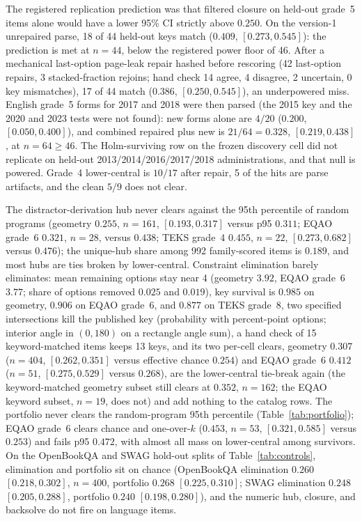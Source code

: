 The registered replication prediction was that filtered closure on held-out grade~5 items alone would have a lower 95\% CI strictly above $0.250$. On the version-1 unrepaired parse, 18 of 44 held-out keys match ($0.409$, $[0.273, 0.545]$): the prediction is met at $n=44$, below the registered power floor of 46. After a mechanical last-option page-leak repair hashed before rescoring (42 last-option repairs, 3 stacked-fraction rejoins; hand check 14 agree, 4 disagree, 2 uncertain, 0 key mismatches), 17 of 44 match ($0.386$, $[0.250, 0.545]$), an underpowered miss. English grade~5 forms for 2017 and 2018 were then parsed (the 2015 key and the 2020 and 2023 tests were not found): new forms alone are $4/20$ ($0.200$, $[0.050, 0.400]$), and combined repaired plus new is $21/64=0.328$, $[0.219, 0.438]$, at $n=64\ge 46$. The Holm-surviving row on the frozen discovery cell did not replicate on held-out 2013/2014/2016/2017/2018 administrations, and that null is powered. Grade~4 lower-central is $10/17$ after repair, 5 of the hits are parse artifacts, and the clean $5/9$ does not clear.

The distractor-derivation hub never clears against the 95th percentile of random programs (geometry $0.255$, $n=161$, $[0.193, 0.317]$ versus p95 $0.311$; EQAO grade~6 $0.321$, $n=28$, versus $0.438$; TEKS grade~4 $0.455$, $n=22$, $[0.273, 0.682]$ versus $0.476$); the unique-hub share among 992 family-scored items is $0.189$, and most hubs are ties broken by lower-central. Constraint elimination barely eliminates: mean remaining options stay near 4 (geometry $3.92$, EQAO grade~6 $3.77$; share of options removed $0.025$ and $0.019$), key survival is $0.985$ on geometry, $0.906$ on EQAO grade~6, and $0.877$ on TEKS grade~8, two specified intersections kill the published key (probability with percent-point options; interior angle in $(0,180)$ on a rectangle angle sum), a hand check of 15 keyword-matched items keeps 13 keys, and its two per-cell clears, geometry $0.307$ ($n=404$, $[0.262, 0.351]$ versus effective chance $0.254$) and EQAO grade~6 $0.412$ ($n=51$, $[0.275, 0.529]$ versus $0.268$), are the lower-central tie-break again (the keyword-matched geometry subset still clears at $0.352$, $n=162$; the EQAO keyword subset, $n=19$, does not) and add nothing to the catalog rows. The portfolio never clears the random-program 95th percentile (Table~\ref{tab:portfolio}); EQAO grade~6 clears chance and one-over-$k$ ($0.453$, $n=53$, $[0.321, 0.585]$ versus $0.253$) and fails p95 $0.472$, with almost all mass on lower-central among survivors. On the OpenBookQA and SWAG hold-out splits of Table~\ref{tab:controls}, elimination and portfolio sit on chance (OpenBookQA elimination $0.260$ $[0.218, 0.302]$, $n=400$, portfolio $0.268$ $[0.225, 0.310]$; SWAG elimination $0.248$ $[0.205, 0.288]$, portfolio $0.240$ $[0.198, 0.280]$), and the numeric hub, closure, and backsolve do not fire on language items.

